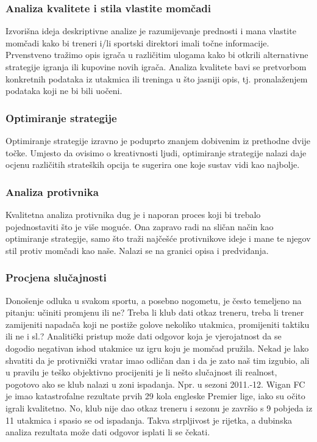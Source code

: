 \documentclass{ferseminar}
\begin{document}
\subsubsection{Analiza kvalitete i stila vlastite momčadi}
Izvorišna ideja deskriptivne analize je razumijevanje prednosti i mana vlastite momčadi kako bi treneri i/li sportski direktori imali točne informacije. Prvenstveno tražimo opis igrača u različitim ulogama kako bi otkrili alternativne strategije igranja ili kupovine novih igrača. Analiza kvalitete bavi se pretvorbom konkretnih podataka iz utakmica ili treninga u što jasniji opis, tj. pronalaženjem podataka koji ne bi bili uočeni.

\subsubsection{Optimiranje strategije}
Optimiranje strategije izravno je poduprto znanjem dobivenim iz prethodne dvije točke. Umjesto da ovisimo o kreativnosti ljudi, optimiranje strategije nalazi daje ocjenu različitih strateških opcija te sugerira one koje sustav vidi kao najbolje.

\subsubsection{Analiza protivnika}
Kvalitetna analiza protivnika dug je i naporan proces koji bi trebalo pojednostaviti što je više moguće. Ona zapravo radi na sličan način kao optimiranje strategije, samo što traži najčešće protivnikove ideje i mane te njegov stil protiv momčadi kao naše. Nalazi se na granici opisa i predviđanja.

\subsubsection{Procjena slučajnosti}
Donošenje odluka u svakom sportu, a posebno nogometu, je često temeljeno na pitanju: učiniti promjenu ili ne? Treba li klub dati otkaz treneru, treba li trener zamijeniti napadača koji ne postiže golove nekoliko utakmica, promijeniti taktiku ili ne i sl.? Analitički pristup može dati odgovor koja je vjerojatnost da se dogodio negativan ishod utakmice uz igru koju je momčad pružila. Nekad je lako shvatiti da je protivnički vratar imao odličan dan i da je zato naš tim izgubio, ali u pravilu je teško objektivno procijeniti je li nešto slučajnost ili realnost, pogotovo ako se klub nalazi u zoni ispadanja. Npr. u sezoni 2011.-12. Wigan FC je imao katastrofalne rezultate prvih 29 kola engleske Premier lige, iako su očito igrali kvalitetno. No, klub nije dao otkaz treneru i sezonu je završio s 9 pobjeda iz 11 utakmica i spasio se od ispadanja. Takva strpljivost je rijetka, a dubinska analiza rezultata može dati odgovor isplati li se čekati.
\end{document}
